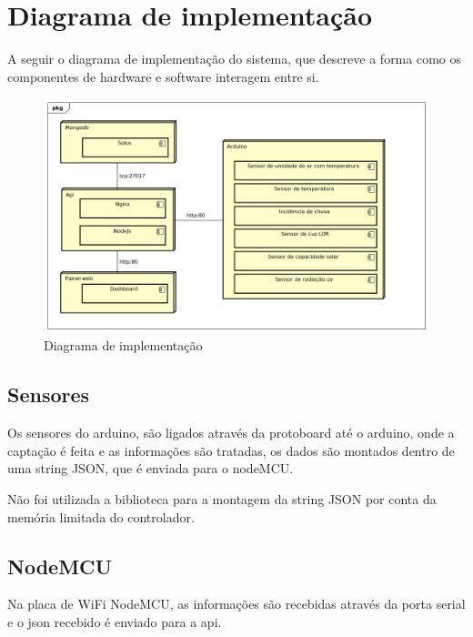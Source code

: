 \chapter{Diagrama de implementação}

A seguir o diagrama de implementação do sistema, que descreve a forma como os componentes de hardware e software interagem entre si.

\begin{figure}[H]
    \label{figure_diagrama_implementacao}
    \centering
    \caption{Diagrama de implementação}
    \includegraphics[scale=0.6]{diagrams/implementacao.png}
    \hfill
\end{figure}

\section{Sensores}

Os sensores do arduino, são ligados através da protoboard até o arduino, onde a captação é feita e as informações são tratadas, os dados são montados dentro de uma string JSON, que é enviada para o nodeMCU.

Não foi utilizada a biblioteca para a montagem da string JSON por conta da memória limitada do controlador.

\section{NodeMCU}

Na placa de WiFi NodeMCU, as informações são recebidas através da porta serial e o json recebido é enviado para a api.

